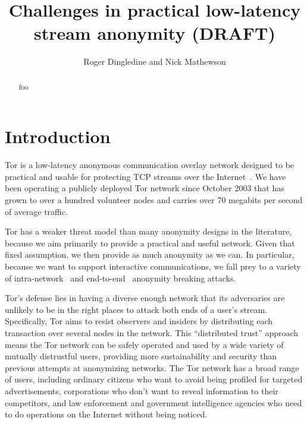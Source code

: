 \documentclass{llncs}
\begin{document}
\title{Challenges in practical low-latency stream anonymity (DRAFT)}

\author{Roger Dingledine and Nick Mathewson}

\maketitle
\pagestyle{empty}

\begin{abstract}
foo
\end{abstract}

\section{Introduction}

Tor is a low-latency anonymous communication overlay network designed
to be practical and usable for protecting TCP streams over the
Internet~\cite{tor-design}. We have been operating a publicly deployed
Tor network since October 2003 that has grown to over a hundred volunteer
nodes and carries over 70 megabits per second of average traffic.

Tor has a weaker threat model than many anonymity designs in the
literature, because we aim primarily to provide a
practical and useful network. Given that fixed assumption, we then
provide as much anonymity as we can. In particular, because we
want to support interactive communications, we fall prey to a variety
of intra-network~\cite{danezis-oakland,flow-correlation04,bar} and
end-to-end~\cite{danezis-pet2004,SS03} anonymity breaking attacks.

Tor's defense lies in having a diverse enough network that its adversaries
are unlikely to be in the right places to attack both ends of a user's
stream. Specifically,
Tor aims to resist observers and insiders by distributing each transaction
over several nodes in the network.  This ``distributed trust'' approach
means the Tor network can be safely operated and used by a wide variety
of mutually distrustful users, providing more sustainability and security
than previous attempts at anonymizing networks.
The Tor network has a broad range of users, including ordinary citizens
who want to avoid being profiled for targeted advertisements, corporations
who don't want to reveal information to their competitors, and law
enforcement and government intelligence agencies who need
to do operations on the Internet without being noticed.
\end{document}
